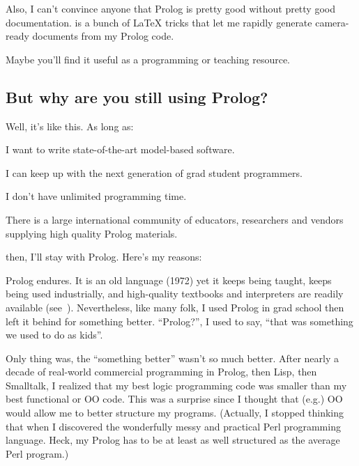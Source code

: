 Also, I can't convince anyone that Prolog is pretty good without
pretty good documentation. {\PROD} is a bunch of {\LaTeX} tricks that
let me rapidly generate camera-ready documents from my Prolog code.

Maybe you'll
find it useful as a programming or teaching resource.


\subsection{But why are you still using Prolog?}

Well, it's like this. As long as:

\bi


\item

I want to write state-of-the-art model-based software.

\item

I can keep up with the next generation of grad student programmers.

\item

I don't have unlimited programming time.

\item

There is a large international community of educators, researchers and vendors
supplying high quality Prolog materials.

\ei

\noindent
then, I'll stay with Prolog.  Here's my reasons:

Prolog endures. It is an old language (1972) yet it keeps being
taught, keeps being used industrially,  and high-quality textbooks
and interpreters are readily available
(see~). Nevertheless, like many folk, I used
Prolog in grad school then left it behind for something better.
``Prolog?'', I used to say, ``that was something we used to do as
kids''.

Only
thing was, the ``something better'' wasn't so much better. After nearly a decade  of real-world
commercial programming in Prolog, then Lisp, then Smalltalk, I realized
that my best logic programming code was smaller than my best functional or OO code.
This was a surprise since I thought that (e.g.) OO would allow me to better structure my programs. (Actually, I stopped thinking that when I discovered the wonderfully messy and practical Perl programming language.
Heck, my Prolog has to be at least as well structured as the average Perl program.)


